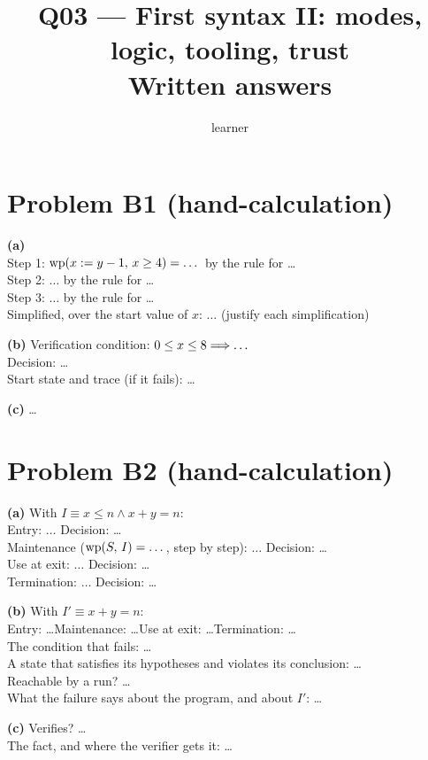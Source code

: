 \documentclass[11pt]{article}
\title{Q03 --- First syntax II: modes, logic, tooling, trust \\ \large Written answers}
\author{learner}
\date{}
\begin{document}
\maketitle

\section*{Problem B1 (hand-calculation)}\label{ans:B1}
\begin{answer}
\textbf{(a)} \\
Step 1: $\mathrm{wp}(x \mathrel{:=} y - 1,\,x \geq 4) = \dots$ \quad by the rule for \dots \\
Step 2: $\dots$ \quad by the rule for \dots \\
Step 3: $\dots$ \quad by the rule for \dots \\
Simplified, over the start value of $x$: $\dots$ \quad (justify each simplification)

\textbf{(b)} Verification condition: $0 \leq x \leq 8 \Longrightarrow \dots$ \\
Decision: \dots \\
Start state and trace (if it fails): \dots

\textbf{(c)} \dots
\end{answer}

\section*{Problem B2 (hand-calculation)}\label{ans:B2}
\begin{answer}
\textbf{(a)} With $I \equiv x \leq n \wedge x + y = n$: \\
Entry: $\dots$ \quad Decision: \dots \\
Maintenance ($\mathrm{wp}(S,\,I) = \dots$, step by step): $\dots$ \quad Decision: \dots \\
Use at exit: $\dots$ \quad Decision: \dots \\
Termination: $\dots$ \quad Decision: \dots

\textbf{(b)} With $I' \equiv x + y = n$: \\
Entry: \dots \quad Maintenance: \dots \quad Use at exit: \dots \quad Termination: \dots \\
The condition that fails: \dots \\
A state that satisfies its hypotheses and violates its conclusion: \dots \\
Reachable by a run? \dots \\
What the failure says about the program, and about $I'$: \dots

\textbf{(c)} Verifies? \dots \\
The fact, and where the verifier gets it: \dots
\end{answer}
\end{document}
